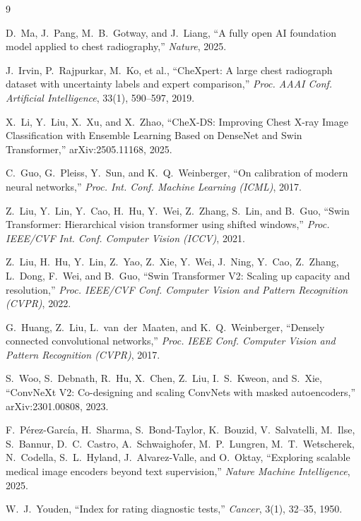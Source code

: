 \documentclass[11pt]{article}
\begin{document}
\vspace{-14pt}
\footnotesize

\begin{thebibliography}{9}
\setlength{\itemsep}{0pt}
\setlength{\parskip}{0pt}

D.~Ma, J.~Pang, M.~B.~Gotway, and J.~Liang,
``A fully open AI foundation model applied to chest radiography,''
\emph{Nature}, 2025.

J.~Irvin, P.~Rajpurkar, M.~Ko, et al.,
``CheXpert: A large chest radiograph dataset with uncertainty labels and expert comparison,''
\emph{Proc. AAAI Conf. Artificial Intelligence}, 33(1), 590--597, 2019.

X.~Li, Y.~Liu, X.~Xu, and X.~Zhao,
``CheX-DS: Improving Chest X-ray Image Classification with Ensemble Learning Based on DenseNet and Swin Transformer,''
arXiv:2505.11168, 2025.

C.~Guo, G.~Pleiss, Y.~Sun, and K.~Q.~Weinberger,
``On calibration of modern neural networks,''
\emph{Proc. Int. Conf. Machine Learning (ICML)}, 2017.

Z.~Liu, Y.~Lin, Y.~Cao, H.~Hu, Y.~Wei, Z.~Zhang, S.~Lin, and B.~Guo,
``Swin Transformer: Hierarchical vision transformer using shifted windows,''
\emph{Proc. IEEE/CVF Int. Conf. Computer Vision (ICCV)}, 2021.

Z.~Liu, H.~Hu, Y.~Lin, Z.~Yao, Z.~Xie, Y.~Wei, J.~Ning, Y.~Cao, Z.~Zhang, L.~Dong, F.~Wei, and B.~Guo,
``Swin Transformer V2: Scaling up capacity and resolution,''
\emph{Proc. IEEE/CVF Conf. Computer Vision and Pattern Recognition (CVPR)}, 2022.

G.~Huang, Z.~Liu, L.~van~der~Maaten, and K.~Q.~Weinberger,
``Densely connected convolutional networks,''
\emph{Proc. IEEE Conf. Computer Vision and Pattern Recognition (CVPR)}, 2017.

S.~Woo, S.~Debnath, R.~Hu, X.~Chen, Z.~Liu, I.~S.~Kweon, and S.~Xie,
``ConvNeXt V2: Co-designing and scaling ConvNets with masked autoencoders,''
arXiv:2301.00808, 2023.

F.~P\'erez-Garc\'ia, H.~Sharma, S.~Bond-Taylor, K.~Bouzid, V.~Salvatelli, M.~Ilse, S.~Bannur, D.~C.~Castro, A.~Schwaighofer, M.~P.~Lungren, M.~T.~Wetscherek, N.~Codella, S.~L.~Hyland, J.~Alvarez-Valle, and O.~Oktay,
``Exploring scalable medical image encoders beyond text supervision,''
\emph{Nature Machine Intelligence}, 2025.

W.~J.~Youden,
``Index for rating diagnostic tests,''
\emph{Cancer}, 3(1), 32--35, 1950.

\end{thebibliography}
\end{document}
